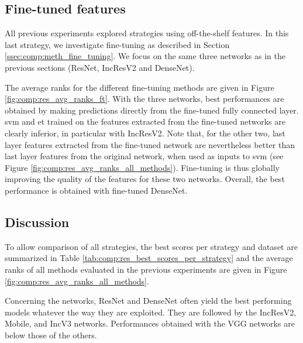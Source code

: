 \subsection{Fine-tuned features}
\label{ssec:comp:exp_fine_tuning}

All previous experiments explored strategies using off-the-shelf features. In this last strategy, we investigate fine-tuning as described in Section \ref{ssec:comp:meth_fine_tuning}. We focus on the same three networks as in the previous sections (ResNet, IncResV2 and DenseNet).

The average ranks for the different fine-tuning methods are given in Figure \ref{fig:comp:res_avg_ranks_ft}. With the three networks, best performances are obtained by making predictions directly from the fine-tuned fully connected layer. \acrshort{svm} and \acrshort{et} trained on the features extracted from the fine-tuned networks are clearly inferior, in particular with IncResV2. Note that, for the other two, last layer features extracted from the fine-tuned network are nevertheless better than last layer features from the original network, when used as inputs to \acrshort{svm} (see Figure \ref{fig:comp:res_avg_ranks_all_methods}). Fine-tuning is thus globally improving the quality of the features for these two networks. Overall, the best performance is obtained with fine-tuned DenseNet.



\subsection{Discussion}
\label{ssec:comp:exp_comparing}



To allow comparison of all strategies, the best scores per strategy and dataset are summarized in Table \ref{tab:comp:res_best_scores_per_strategy} and the average ranks of all methods evaluated in the previous experiments are given in Figure \ref{fig:comp:res_avg_ranks_all_methods}.

Concerning the networks, ResNet and DenseNet often yield the best performing models whatever the way they are exploited. They are followed by the IncResV2, Mobile, and IncV3 networks. Performances obtained with the VGG networks are below those of the others.

